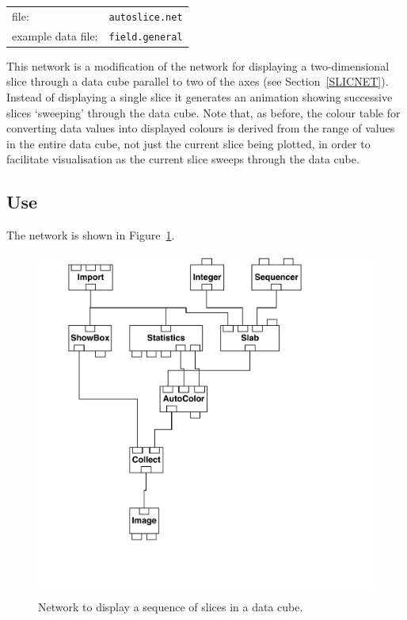 \documentclass[twoside,11pt]{article}
\begin{document}
\begin{tabular}{ll}
file:              & {\tt autoslice.net} \\
example data file: & {\tt field.general} \\
\end{tabular}

This network is a modification of the network for displaying a
two-dimensional slice through a data cube parallel to two of the axes
(see Section~\ref{SLICNET}). Instead of displaying a single slice it
generates an animation showing successive slices `sweeping' through the
data cube. Note that, as before, the colour table for converting data
values into displayed colours is derived from the range of values in the
entire data cube, not just the current slice being plotted, in order to
facilitate visualisation as the current slice sweeps through the data
cube.

\subsection{Use}

The network is shown in Figure~\ref{ASLICNETF}.

\begin{figure}[htbp]

\begin{center}
\leavevmode
\includegraphics[width=553pt]{sc2_autoslice}
\end{center}

\caption[Network to display a sequence of slices in a data cube.]{Network
to display a sequence of slices in a data cube. \label{ASLICNETF} }

\end{figure}
\end{document}
